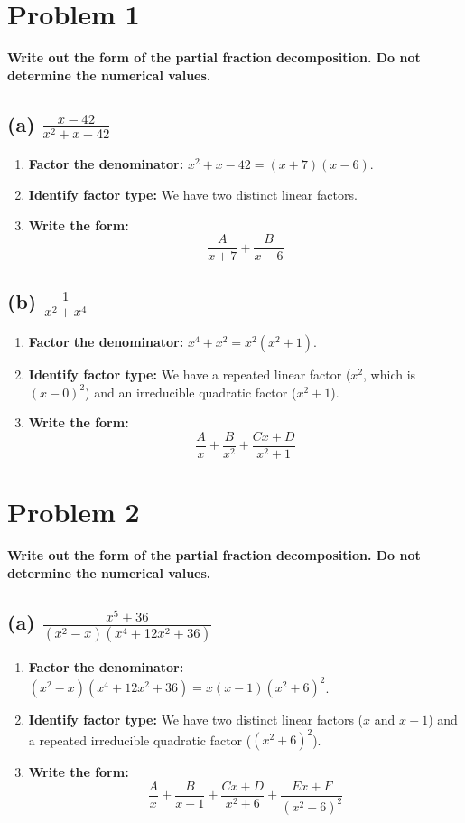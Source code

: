 \documentclass{article}
\begin{document}
\section{Problem 1}
\textbf{Write out the form of the partial fraction decomposition. Do not determine the numerical values.}
\subsection*{(a) $\displaystyle\frac{x-42}{x^2+x-42}$}
\begin{enumerate}
    \item \textbf{Factor the denominator:} $x^2+x-42 = (x+7)(x-6)$.
    \item \textbf{Identify factor type:} We have two distinct linear factors.
    \item \textbf{Write the form:}
    \[ \frac{A}{x+7} + \frac{B}{x-6} \]
\end{enumerate}

\subsection*{(b) $\displaystyle\frac{1}{x^2+x^4}$}
\begin{enumerate}
    \item \textbf{Factor the denominator:} $x^4+x^2 = x^2(x^2+1)$.
    \item \textbf{Identify factor type:} We have a repeated linear factor ($x^2$, which is $(x-0)^2$) and an irreducible quadratic factor ($x^2+1$).
    \item \textbf{Write the form:}
    \[ \frac{A}{x} + \frac{B}{x^2} + \frac{Cx+D}{x^2+1} \]
\end{enumerate}

\section{Problem 2}
\textbf{Write out the form of the partial fraction decomposition. Do not determine the numerical values.}
\subsection*{(a) $\displaystyle\frac{x^5+36}{(x^2-x)(x^4+12x^2+36)}$}
\begin{enumerate}
    \item \textbf{Factor the denominator:} $(x^2-x)(x^4+12x^2+36) = x(x-1)(x^2+6)^2$.
    \item \textbf{Identify factor type:} We have two distinct linear factors ($x$ and $x-1$) and a repeated irreducible quadratic factor ($(x^2+6)^2$).
    \item \textbf{Write the form:}
    \[ \frac{A}{x} + \frac{B}{x-1} + \frac{Cx+D}{x^2+6} + \frac{Ex+F}{(x^2+6)^2} \]
\end{enumerate}
\end{document}
